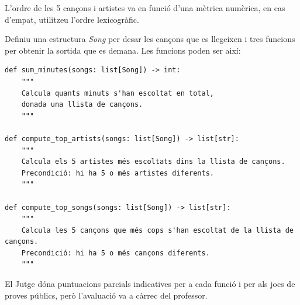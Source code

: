\Observation

L'ordre de les 5 cançons i artistes va en funció d'una mètrica numèrica, en cas d'empat, utilitzeu l'ordre lexicogràfic.

\medskip

Definiu una estructura \emph{Song} per desar les cançons que es llegeixen i tres funcions per obtenir la sortida que es demana. Les funcions poden ser així:

\begin{footnotesize}
\begin{verbatim}
def sum_minutes(songs: list[Song]) -> int:
    """
    Calcula quants minuts s'han escoltat en total, 
    donada una llista de cançons.
    """

def compute_top_artists(songs: list[Song]) -> list[str]:
    """
    Calcula els 5 artistes més escoltats dins la llista de cançons.    
    Precondició: hi ha 5 o més artistes diferents.
    """

def compute_top_songs(songs: list[Song]) -> list[str]:
    """
    Calcula les 5 cançons que més cops s'han escoltat de la llista de cançons.
    Precondició: hi ha 5 o més cançons diferents.
    """
\end{verbatim}
\end{footnotesize}

El Jutge dóna puntuacions parcials indicatives per a cada funció i per als jocs de proves públics, però l'avaluació va a càrrec del professor.

\SampleOneCol
